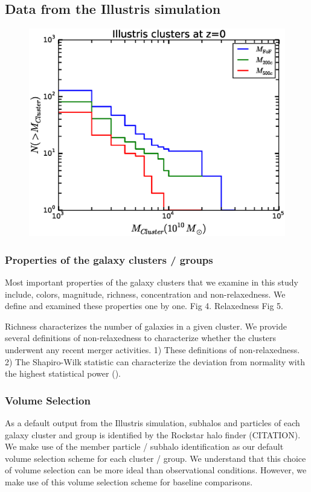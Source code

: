 \documentclass[letterpaper,useAMS,usenatbib]{mn2e}
\begin{document}
\subsection{Data from the Illustris simulation} 
\begin{figure}
	\includegraphics[width=.95\linewidth]{clusterMassDist.eps}
	\caption{
		\label{fig:config}}
\end{figure}


\subsubsection{Properties of the galaxy clusters / groups}
Most important properties of the galaxy clusters that we examine in this
study include, colors, magnitude, richness, concentration and non-relaxedness. We define
and examined these properties one by one. 
Fig 4. Relaxedness 
Fig 5. 

Richness characterizes the number of galaxies in a given cluster.
We provide several definitions of non-relaxedness to characterize whether
the clusters underwent any recent merger activities. 
1) These definitions of non-relaxedness.
2) 
The Shapiro-Wilk statistic can characterize the deviation from normality
with the highest statistical power ().


\subsubsection{Volume Selection}
As a default output from the Illustris simulation, subhalos and particles of
each galaxy cluster and group is identified by the Rockstar halo finder
(CITATION). We make use of the member particle / subhalo identification as our
default volume selection scheme for each cluster / group.
We understand that this choice of volume selection can be more ideal than
observational conditions. However, we make use of this volume selection scheme
for baseline comparisons. 
\end{document}
